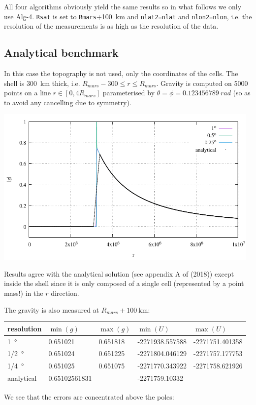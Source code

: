 All four algorithms obviously yield the same results so in what follows we 
only use Alg-4. \lstinline{Rsat} is set to \lstinline{Rmars}+100~km and \lstinline{nlat2=nlat}
and \lstinline{nlon2=nlon}, i.e. the resolution of the measurements is as high as the 
resolution of the data.

\newpage
\subsection*{Analytical benchmark}

In this case the topography is not used, only the coordinates of the cells. 
The shell is 300~\si{\km} thick, i.e. $R_{mars}-300 \le r \le R_{mars}$.
Gravity is computed on 5000 points on a line $r\in[0,4R_{mars}]$ parameterised by 
$\theta=\phi=0.123456789~\si{rad}$ (so as to avoid any cancelling due to symmetry).

\begin{center}
\includegraphics[width=13cm]{python_codes/fieldstone_100/results/gravity_on_line.pdf}
\end{center}

Results agree with the analytical solution (see appendix A of \textcite{thie18} (2018))
except inside the shell since it is only composed of a 
single cell (represented by a point mass!) in the $r$ direction. 

The gravity is also measured at $R_{mars}+100~\si{\km}$:

\begin{center}
\begin{tabular}{lllll}
\hline
resolution        & $\min(g)$ & $\max(g)$ & $\min(U)$ & $\max(U)$ \\
\hline
\hline
1~\si{\degree}    & 0.651021 & 0.651818 & -2271938.557588 & -2271751.401358 \\
1/2~\si{\degree}  & 0.651024 & 0.651225 & -2271804.046129 & -2271757.177753 \\
1/4~\si{\degree}  & 0.651025 & 0.651075 & -2271770.343922 & -2271758.621926 \\
\hline
analytical & 0.65102561831 & & -2271759.10332  \\
\hline
\end{tabular}
\end{center}
We see that the errors are concentrated above the poles:


